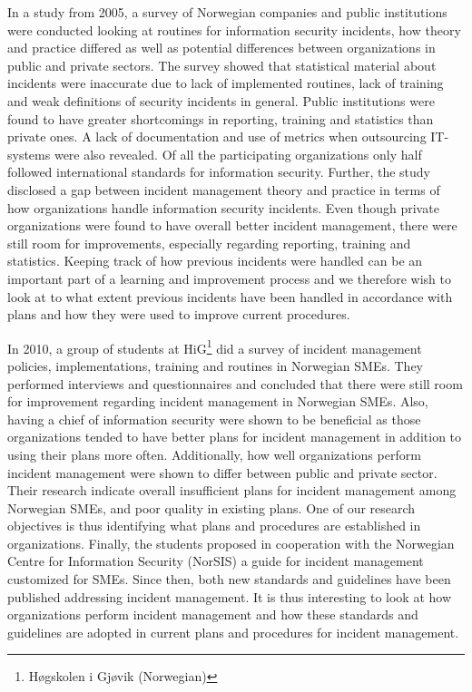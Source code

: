 In a study from 2005\cite{brage}, a survey of Norwegian companies and public institutions were conducted looking at routines for information security incidents, how theory and practice differed as well as potential differences between organizations in public and private sectors. The survey showed that statistical material about incidents were inaccurate due to lack of implemented routines, lack of training and weak definitions of security incidents in general. Public institutions were found to have greater shortcomings in reporting, training and statistics than private ones. A lack of documentation and use of metrics when outsourcing IT-systems were also revealed. Of all the participating organizations only half followed international standards for information security. Further, the study disclosed a gap between incident management theory and practice in terms of how organizations handle information security incidents. Even though private organizations were found to have overall better incident management, there were still room for improvements, especially regarding reporting, training and statistics. Keeping track of how previous incidents were handled can be an important part of a learning and improvement process and we therefore wish to look at to what extent previous incidents have been handled in accordance with plans and how they were used to improve current procedures.

In 2010, a group of students at HiG\footnote{H\o gskolen i Gj\o vik (Norwegian)} did a survey of incident management policies, implementations, training and routines in Norwegian \acp{SME}. They performed interviews and questionnaires and concluded that there were still room for improvement regarding incident management in Norwegian \acp{SME}. Also, having a chief of information security were shown to be beneficial as those organizations tended to have better plans for incident management in addition to using their plans more often. Additionally, how well organizations perform incident management were shown to differ between public and private sector. Their research indicate overall insufficient plans for incident management among Norwegian \acp{SME}, and poor quality in existing plans. One of our research objectives is thus identifying what plans and procedures are established in organizations. Finally, the students proposed in cooperation with the Norwegian Centre for Information Security (NorSIS) a guide for incident management customized for \acp{SME}. Since then, both new standards and guidelines have been published addressing incident management. It is thus interesting to look at how organizations perform incident management and how these standards and guidelines are adopted in current plans and procedures for incident management.

